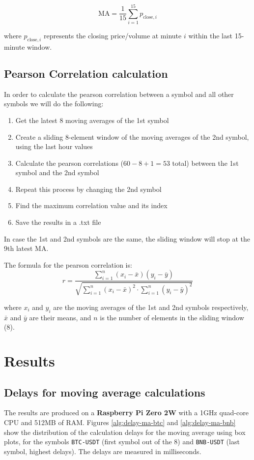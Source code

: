 \documentclass{article}
\begin{document}
\begin{equation*}
\text{MA} = \frac{1}{15} \sum_{i=1}^{15} p_{\text{close},i}
\end{equation*}

where $p_{\text{close},i}$ represents the closing price/volume at minute $i$ within the last 15-minute window.


\subsection{Pearson Correlation calculation}
In order to calculate the pearson correlation between a symbol and all other symbols we will do the following:

\begin{enumerate}
    \item Get the latest 8 moving averages of the 1st symbol
    \item Create a sliding 8-element window of the moving averages of the 2nd symbol, using the last hour values
    \item Calculate the pearson correlations ($60-8+1=53$ total) between the 1st symbol and the 2nd symbol
    \item Repeat this process by changing the 2nd symbol
    \item Find the maximum correlation value and its index
    \item Save the results in a .txt file
\end{enumerate}

In case the 1st and 2nd symbols are the same, the sliding window will stop at the 9th latest MA.

The formula for the pearson correlation is:
\begin{equation*}
r = \frac{\sum_{i=1}^{n} (x_i - \bar{x})(y_i - \bar{y})}{\sqrt{\sum_{i=1}^{n} (x_i - \bar{x})^2 \cdot \sum_{i=1}^{n} (y_i - \bar{y})^2}}
\end{equation*}

where $x_i$ and $y_i$ are the moving averages of the 1st and 2nd symbols respectively, $\bar{x}$ and $\bar{y}$ are their means, and $n$ is the number of elements in the sliding window (8).

\section{Results}

\subsection{Delays for moving average calculations}
The results are produced on a \textbf{Raspberry Pi Zero 2W} with a 1GHz quad-core CPU and 512MB of RAM.
Figures \ref{alg:delay-ma-btc} and \ref{alg:delay-ma-bnb} show the distribution of the calculation delays 
for the moving average using box plots, for the symbols \texttt{BTC-USDT} (first symbol out of the 8) 
and \texttt{BNB-USDT} (last symbol, highest delays). The delays are measured in milliseconds.
\end{document}
